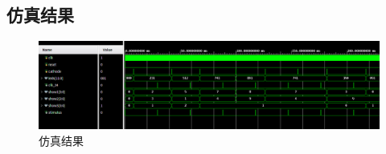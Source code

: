 \documentclass{article}
\begin{document}
\subsection{仿真结果}
\begin{figure}[H]
    \centering
    \includegraphics[width = 12cm]{images/timing.png}
    \caption{仿真结果}\label{fig6}
\end{figure}
\end{document}

